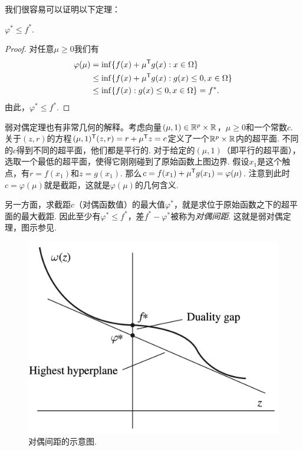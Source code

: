 我们很容易可以证明以下定理：

\begin{theorem}[弱对偶定理]\label{thm:weak-dual}
    $\varphi^\ast\le f^\ast$.
\end{theorem}

\begin{proof}
    对任意${\mu \ge 0}$我们有
    \begin{align*}
        \varphi({\mu}) &=\inf\{f({x})+{\mu^{\mathsf{T}} g(x):x}\in\Omega\} \\
        & \le \inf\{f({x})+{\mu^{\mathsf{T}} g(x):g(x)\le 0,x}\in\Omega\} \\
        & \le \inf\{f({x}):{g(x)\le 0, x}\in\Omega\}=f^\ast.
    \end{align*}
    由此，$\varphi^\ast\le f^\ast$. 
\end{proof}

弱对偶定理也有非常几何的解释。考虑向量$(\mu,1)\in \mathbb{R}^{p}\times\mathbb{R}$，${\mu}\ge{0}$和一个常数$c$. 关于$(z,r)$的方程$({\mu},1)^{\mathsf{T}} (z,r)=r+{\mu^{\mathsf{T}} z}=c$定义了一个$\mathbb{R}^{p}\times\mathbb{R}$内的超平面. 不同的$c$得到不同的超平面，他们都是平行的. 对于给定的$({\mu},1)$（即平行的超平面），选取一个最低的超平面，使得它刚刚碰到了原始函数上图边界. 假设${x_1}$是这个触点，有$r=f(x_1)$和$z=g(x_1)$. 那么$c=f({x_1})+{\mu^{\mathsf{T}} g(x_1)}=\varphi({\mu})$. 注意到此时$c=\varphi({\mu})$就是截距，这就是$\varphi(\mu)$的几何含义.

另一方面，求截距$c$（对偶函数值）的最大值$\varphi^*$，就是求位于原始函数之下的超平面的最大截距. 因此至少有$\varphi^*\leq f^*$，差$f^*-\varphi^*$被称为\emph{对偶间距}. 这就是弱对偶定理，图示参见.

\begin{figure}
    \centering
    \includegraphics[scale=0.3]{Chapters/duality/figures/highest-hyperplane.png}
    \caption{对偶间距的示意图.}
    \label{fig:highest-hyperplane}
\end{figure}

